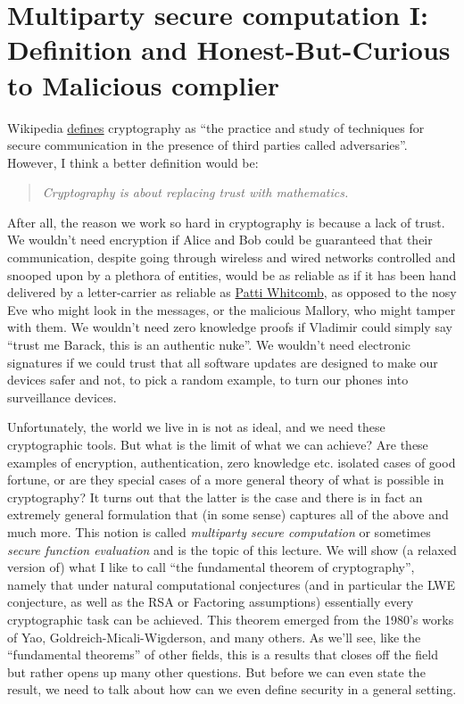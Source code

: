 \chapter{Multiparty secure computation I: Definition and
Honest-But-Curious to Malicious complier}\label{sfeonechap}

Wikipedia \href{https://en.wikipedia.org/wiki/Cryptography}{defines}
cryptography as ``the practice and study of techniques for secure
communication in the presence of third parties called adversaries''.
However, I think a better definition would be:

\begin{quote}
\emph{Cryptography is about replacing trust with mathematics.}
\end{quote}

After all, the reason we work so hard in cryptography is because a lack
of trust. We wouldn't need encryption if Alice and Bob could be
guaranteed that their communication, despite going through wireless and
wired networks controlled and snooped upon by a plethora of entities,
would be as reliable as if it has been hand delivered by a
letter-carrier as reliable as
\href{http://old.iolaregister.com/Local\%20News/Stories/Weatherwontstopcarriers.html}{Patti
Whitcomb}, as opposed to the nosy Eve who might look in the messages, or
the malicious Mallory, who might tamper with them. We wouldn't need zero
knowledge proofs if Vladimir could simply say ``trust me Barack, this is
an authentic nuke''. We wouldn't need electronic signatures if we could
trust that all software updates are designed to make our devices safer
and not, to pick a random example, to turn our phones into surveillance
devices.

Unfortunately, the world we live in is not as ideal, and we need these
cryptographic tools. But what is the limit of what we can achieve? Are
these examples of encryption, authentication, zero knowledge etc.
isolated cases of good fortune, or are they special cases of a more
general theory of what is possible in cryptography? It turns out that
the latter is the case and there is in fact an extremely general
formulation that (in some sense) captures all of the above and much
more. This notion is called \emph{multiparty secure computation} or
sometimes \emph{secure function evaluation} and is the topic of this
lecture. We will show (a relaxed version of) what I like to call ``the
fundamental theorem of cryptography'', namely that under natural
computational conjectures (and in particular the LWE conjecture, as well
as the RSA or Factoring assumptions) essentially every cryptographic
task can be achieved. This theorem emerged from the 1980's works of Yao,
Goldreich-Micali-Wigderson, and many others. As we'll see, like the
``fundamental theorems'' of other fields, this is a results that closes
off the field but rather opens up many other questions. But before we
can even state the result, we need to talk about how can we even define
security in a general setting.

